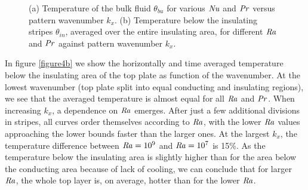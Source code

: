 \documentclass{jfm}
\newcommand\Pran{\mbox{\textit{Pr}}} %
\newcommand\Ray{\mbox{\textit{Ra}}}  %
\newcommand\Nus{\mbox{\textit{Nu}}}  %
\begin{document}
\begin{figure}
\centering
{}
{}
\caption{(a) Temperature of the bulk fluid $\theta_{bu}$
for various $\Nus$ and $\Pran$ versus pattern wavenumber $k_x$. (b)
Temperature below the insulating stripes $\theta_{in}$, averaged over the
entire insulating area, for different $\Ray$ and $\Pran$ against pattern
wavenumber $k_x$.}
\label{figure4}
\end{figure}%

In figure \ref{figure4b} we show the horizontally and time averaged
temperature below the insulating area of the top plate as function of the
wavenumber.  At the lowest wavenumber (top plate split into equal conducting
and insulating regions), we see that the averaged temperature is almost equal
for all $\Ray$ and $\Pran$.  When increasing $k_x$, a dependence on $\Ray$
emerges.  After just a few additional divisions in stripes, all curves order
themselves according to $\Ray$, with the lower $\Ray$ values approaching the
lower bounds faster than the larger ones.  At the largest $k_x$, the
temperature difference between $\Ray =10^9$ and $\Ray=10^7$ is 15\%.  As the
temperature below the insulating area is slightly higher than for the area
below the conducting area because of lack of cooling, we can conclude that for
larger $\Ray$, the whole top layer is, on average, hotter than for the lower
$\Ray$.
\end{document}
